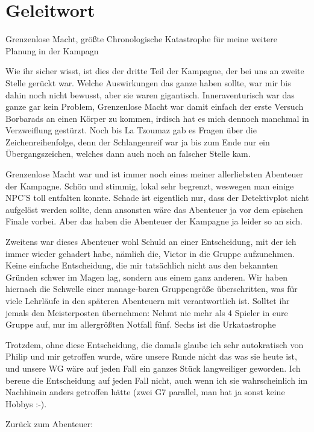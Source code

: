 \section{Geleitwort}
Grenzenlose Macht, größte Chronologische Katastrophe für meine weitere Planung in der Kampagn\par
Wie ihr sicher wisst, ist dies der dritte Teil der Kampagne, der bei uns an zweite Stelle gerückt war. Welche Auswirkungen das ganze haben sollte, war mir bis dahin noch nicht bewusst, aber sie waren gigantisch. Inneraventurisch war das ganze gar kein Problem, Grenzenlose Macht war damit einfach der erste Versuch Borbarads an einen Körper zu kommen, irdisch hat es mich dennoch manchmal in Verzweiflung gestürzt. Noch bis La Tzoumaz gab es Fragen über die Zeichenreihenfolge, denn der Schlangenreif war ja bis zum Ende nur ein Übergangszeichen, welches dann auch noch an falscher Stelle kam.\par
Grenzenlose Macht war und ist immer noch eines meiner allerliebsten Abenteuer der Kampagne. Schön und stimmig, lokal sehr begrenzt, weswegen man einige NPC'S toll entfalten konnte. Schade ist eigentlich nur, dass der Detektivplot  nicht aufgelöst werden sollte, denn ansonsten wäre das Abenteuer ja vor dem epischen Finale vorbei. Aber das haben die Abenteuer der Kampagne ja leider so an sich.\par
Zweitens war dieses Abenteuer wohl Schuld an einer Entscheidung, mit der ich immer wieder gehadert habe, nämlich die, Victor in die Gruppe aufzunehmen. Keine einfache Entscheidung, die mir tatsächlich nicht aus den bekannten Gründen schwer im Magen lag, sondern aus einem ganz anderen. Wir haben hiernach die Schwelle einer manage-baren Gruppengröße überschritten, was für viele Lehrläufe in den späteren Abenteuern mit verantwortlich ist. Solltet ihr jemals den Meisterposten übernehmen: Nehmt nie mehr als 4 Spieler in eure Gruppe auf, nur im allergrößten Notfall fünf. Sechs ist die Urkatastrophe\par
Trotzdem, ohne diese Entscheidung, die damals glaube ich sehr autokratisch von Philip und mir getroffen wurde, wäre unsere Runde nicht das was sie heute ist, und unsere WG wäre auf jeden Fall ein ganzes Stück langweiliger geworden. Ich bereue die Entscheidung auf jeden Fall nicht, auch wenn ich sie wahrscheinlich im Nachhinein anders getroffen hätte (zwei G7 parallel, man hat ja sonst keine Hobbys :-).\par
Zurück zum Abenteuer: \par

